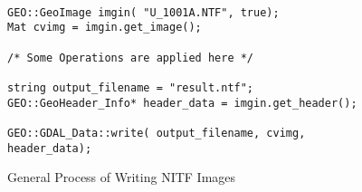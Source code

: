 \documentclass[10pt]{report}
\begin{document}
\begin{figure}[!h]
\begin{verbatim}

GEO::GeoImage imgin( "U_1001A.NTF", true);
Mat cvimg = imgin.get_image();

/* Some Operations are applied here */

string output_filename = "result.ntf";
GEO::GeoHeader_Info* header_data = imgin.get_header();

GEO::GDAL_Data::write( output_filename, cvimg, header_data);

\end{verbatim}
\caption{General Process of Writing NITF Images}
\label{fig::gdal_data01}
\end{figure}
\end{document}
